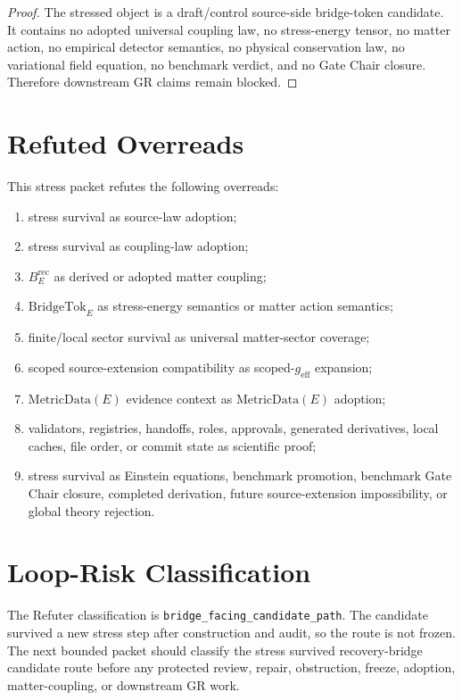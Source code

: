 \documentclass[11pt]{article}
\newcommand{\geff}{g_{\mathrm{eff}}}
\newcommand{\MetricData}{\mathrm{MetricData}}
\newcommand{\BridgeTok}{\mathrm{BridgeTok}}
\newcommand{\BErec}{B_E^{\mathrm{rec}}}
\begin{document}
\begin{proof}
The stressed object is a draft/control source-side bridge-token candidate.
It contains no adopted universal coupling law, no stress-energy tensor, no
matter action, no empirical detector semantics, no physical conservation law,
no variational field equation, no benchmark verdict, and no Gate Chair
closure. Therefore downstream GR claims remain blocked.
\end{proof}

\section{Refuted Overreads}

This stress packet refutes the following overreads:
\begin{enumerate}[leftmargin=*]
  \item stress survival as source-law adoption;
  \item stress survival as coupling-law adoption;
  \item \(\BErec\) as derived or adopted matter coupling;
  \item \(\BridgeTok_E\) as stress-energy semantics or matter action
  semantics;
  \item finite/local sector survival as universal matter-sector coverage;
  \item scoped source-extension compatibility as scoped-\(\geff\) expansion;
  \item \(\MetricData(E)\) evidence context as \(\MetricData(E)\) adoption;
  \item validators, registries, handoffs, roles, approvals, generated
  derivatives, local caches, file order, or commit state as scientific proof;
  \item stress survival as Einstein equations, benchmark promotion, benchmark
  Gate Chair closure, completed derivation, future source-extension
  impossibility, or global theory rejection.
\end{enumerate}

\section{Loop-Risk Classification}

The Refuter classification is \texttt{bridge\_facing\_candidate\_path}. The
candidate survived a new stress step after construction and audit, so the
route is not frozen. The next bounded packet should classify the stress
survived recovery-bridge candidate route before any protected review, repair,
obstruction, freeze, adoption, matter-coupling, or downstream GR work.
\end{document}
